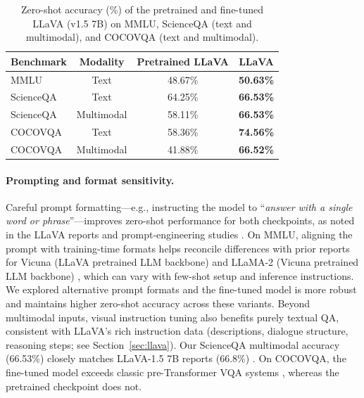 \begin{table}
\centering
\begin{tabular}{lccc}
\toprule
\textbf{Benchmark} & \textbf{Modality} & \textbf{Pretrained LLaVA} & \textbf{LLaVA} \\
\midrule
MMLU & Text & 48.67\% & \textbf{50.63\%} \\
ScienceQA & Text & 64.25\% & \textbf{66.53\%} \\
ScienceQA & Multimodal & 58.11\% & \textbf{66.53\%} \\
COCOVQA & Text & 58.36\% & \textbf{74.56\%} \\
COCOVQA & Multimodal & 41.88\% & \textbf{66.52\%} \\
\bottomrule
\end{tabular}
\caption{
    Zero-shot accuracy (\%) of the pretrained and fine-tuned LLaVA (v1.5 7B) on MMLU, ScienceQA (text and multimodal), and COCOVQA (text and multimodal).
}
\label{tab:benchmark_comparison}
\end{table} 

\paragraph{Prompting and format sensitivity.}

Careful prompt formatting---e.g., instructing the model to ``\emph{answer with a single word or phrase}''---improves zero-shot performance for both checkpoints, as noted in the LLaVA reports \cite{liuImprovedBaselinesVisual2024} and prompt-engineering studies \cite{weiChainofThoughtPromptingElicits2023, chenUnleashingPotentialPrompt2024}. On MMLU, aligning the prompt with training-time formats helps reconcile differences with prior reports for Vicuna (LLaVA pretrained LLM backbone) and LLaMA-2 (Vicuna pretrained LLM backbone) \cite{touvronLlama2Open2023,zhengJudgingLLMasaJudgeMTBench, doimoRepresentationLandscapeFewShot}, which can vary with few-shot setup and inference instructions. We explored alternative prompt formats and the fine-tuned model is more robust and maintains higher zero-shot accuracy across these variants. Beyond multimodal inputs, visual instruction tuning also benefits purely textual QA, consistent with LLaVA's rich instruction data (descriptions, dialogue structure, reasoning steps; see Section~\ref{sec:llava}). Our ScienceQA multimodal accuracy (66.53\%) closely matches LLaVA-1.5 7B reports (66.8\%) \cite{llava_model_zoo}. On COCOVQA, the fine-tuned model exceeds classic pre-Transformer VQA systems \cite{renExploringModelsData2015, luHierarchicalQuestionImageCoAttention2017}, whereas the pretrained checkpoint does not.

